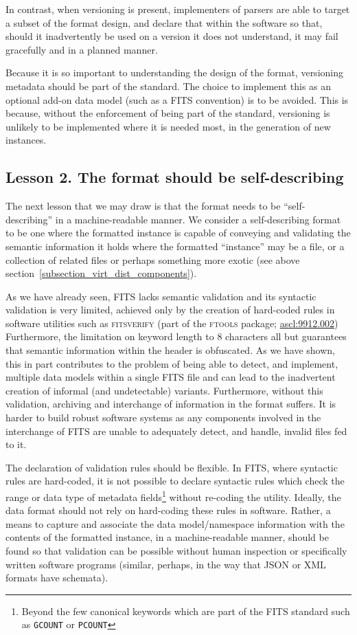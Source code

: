 \documentclass[final,authoryear,5p,times,twocolumn]{elsarticle}
\begin{document}
{{In contrast, when versioning is present, implementers of parsers
are able to target a subset of the format design, and declare
that within the software so that, should it inadvertently be used
on a version it does not understand, it may fail gracefully and
in a planned manner.


Because it is so important to understanding the design of
the format, versioning metadata should be part of the standard.
The choice to implement this as an optional add-on data model
(such as a FITS convention) is to be avoided. This is because,
without the enforcement of being part of the standard, versioning
is unlikely to be implemented where it is needed most, in the
generation of new instances.


\subsection{Lesson 2. The format should be self-describing}
\label{section_lesson_2}

The next lesson that we may draw is that the format needs to be
``self-describing'' in a machine-readable manner.
We consider a self-describing format to be one where the formatted
instance is capable of conveying and validating the semantic information
it holds where the formatted ``instance'' may be a file, or a
collection of related files or perhaps something more exotic
(see above section~\ref{subsection_virt_dist_components}).

As we have already seen, FITS lacks semantic validation and its
syntactic validation is very limited, achieved only by the creation
of hard-coded rules in software utilities such as \textsc{fitsverify}
(part of the \textsc{ftools} package; \href{http://ascl.net/9912.002}{ascl:9912.002})
Furthermore, the limitation on
keyword length to 8 characters all but guarantees that semantic
information within the header is obfuscated. As we have shown,
this in part contributes to the problem of being able to detect,
and implement, multiple data models within a single FITS file
and can lead to the inadvertent creation of informal (and
undetectable) variants. Furthermore, without this validation,
archiving and interchange of information in the format suffers.
It is harder to build robust software systems as any components
involved in the interchange of FITS are unable to adequately
detect, and handle, invalid files fed to it.

The declaration of validation rules should be flexible. In FITS,
where syntactic rules are hard-coded, it is not possible to
declare syntactic rules which check the range or data type of
metadata fields\footnote{Beyond the few canonical keywords
which are part of the FITS standard such as \texttt{GCOUNT}
or \texttt{PCOUNT}} without re-coding the utility.
Ideally, the data format should not rely on hard-coding these rules
in software. Rather, a means to capture and associate the data
model/namespace information with the contents of the formatted
instance, in a machine-readable manner, should be found so that
validation can be possible without human inspection or specifically
written software programs (similar, perhaps, in the way that JSON
or XML formats have schemata).


}}
\end{document}

